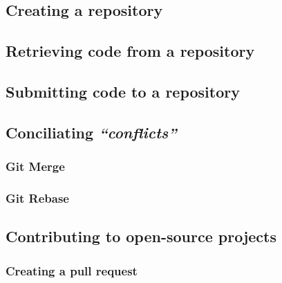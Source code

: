 \documentclass[
]{book}
\begin{document}
\hypertarget{creating-a-repository}{%
\subsection{Creating a repository}\label{creating-a-repository}}

\hypertarget{retrieving-code-from-a-repository}{%
\subsection{Retrieving code from a repository}\label{retrieving-code-from-a-repository}}

\hypertarget{submitting-code-to-a-repository}{%
\subsection{Submitting code to a repository}\label{submitting-code-to-a-repository}}

\hypertarget{conciliating-conflicts}{%
\subsection{\texorpdfstring{Conciliating \emph{``conflicts''}}{Conciliating ``conflicts''}}\label{conciliating-conflicts}}

\hypertarget{git-merge}{%
\subsubsection{Git Merge}\label{git-merge}}

\hypertarget{git-rebase}{%
\subsubsection{Git Rebase}\label{git-rebase}}

\hypertarget{contributing-to-open-source-projects}{%
\subsection{Contributing to open-source projects}\label{contributing-to-open-source-projects}}

\hypertarget{creating-a-pull-request}{%
\subsubsection{Creating a pull request}\label{creating-a-pull-request}}

  
\end{document}
